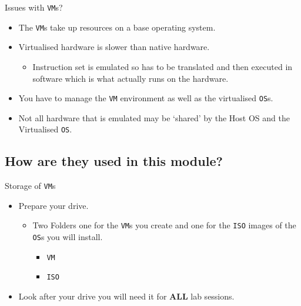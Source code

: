 \documentclass{beamer}
\begin{document}
\begin{frame}{Issues with \texttt{VM}s?}
  \begin{itemize}
    \item The \texttt{VM}s take up resources on a base operating system.
    \item Virtualised hardware is slower than native hardware.
      \begin{itemize}
        \item Instruction set is emulated so has to be translated and then executed in software which is what actually runs on the hardware.
      \end{itemize}
    \item You have to manage the \texttt{VM} environment as well as the virtualised \texttt{OS}s.
    \item Not all hardware that is emulated may be `shared' by the Host OS and the Virtualised \texttt{OS}.  
  \end{itemize}
\end{frame}

\subsection{How are they used in this module?}
\begin{frame}{Storage of \texttt{VM}s}
  \begin{itemize}
    \item Prepare your drive.
      \begin{itemize}
        \item Two Folders one for the \texttt{VM}s you create and one for the \texttt{ISO} images of the \texttt{OS}s you will install.
        \begin{itemize}
          \item \texttt{VM}
          \item \texttt{ISO}
        \end{itemize}  
      \end{itemize}
    \item Look after your drive you will need it for \textbf{ALL} lab sessions.
  \end{itemize}
\end{frame}
\end{document}
